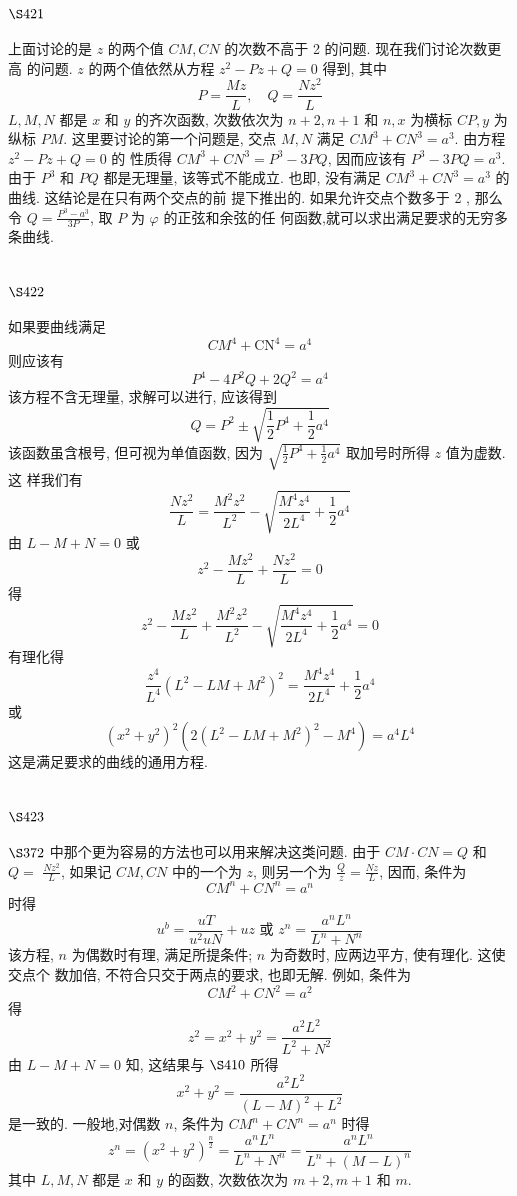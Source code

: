 \section{$\S 421$}

上面讨论的是 $z$ 的两个值 $C M, C N$ 的次数不高于 2 的问题. 现在我们讨论次数更高 的问题. $z$ 的两个值依然从方程 $z^{2}-P z+Q=0$ 得到, 其中
\[
P=\frac{M z}{L}, \quad Q=\frac{N z^{2}}{L}
\]
$L, M, N$ 都是 $x$ 和 $y$ 的齐次函数, 次数依次为 $n+2, n+1$ 和 $n, x$ 为横标 $C P, y$ 为纵标 $P M$. 这里要讨论的第一个问题是, 交点 $M, N$ 满足 $C M^{3}+C N^{3}=a^{3}$. 由方程 $z^{2}-P z+Q=0$ 的 性质得 $C M^{3}+C N^{3}=P^{3}-3 P Q$, 因而应该有 $P^{3}-3 P Q=a^{3}$. 由于 $P^{3}$ 和 $P Q$ 都是无理量, 该等式不能成立. 也即, 没有满足 $C M^{3}+C N^{3}=a^{3}$ 的曲线. 这结论是在只有两个交点的前 提下推出的. 如果允许交点个数多于 2 , 那么令 $Q=\frac{P^{3}-a^{3}}{3 P}$, 取 $P$ 为 $\varphi$ 的正弦和余弦的任 何函数,就可以求出满足要求的无穷多条曲线.

\section{$\S 422$}

如果要曲线满足
\[
C M^{4}+\mathrm{CN}^{4}=a^{4}
\]
则应该有
\[
P^{4}-4 P^{2} Q+2 Q^{2}=a^{4}
\]
该方程不含无理量, 求解可以进行, 应该得到
\[
Q=P^{2} \pm \sqrt{\frac{1}{2} P^{4}+\frac{1}{2} a^{4}}
\]
该函数虽含根号, 但可视为单值函数, 因为 $\sqrt{\frac{1}{2} P^{4}+\frac{1}{2} a^{4}}$ 取加号时所得 $z$ 值为虚数. 这 样我们有
\[
\frac{N z^{2}}{L}=\frac{M^{2} z^{2}}{L^{2}}-\sqrt{\frac{M^{4} z^{4}}{2 L^{4}}+\frac{1}{2} a^{4}}
\]
由 $L-M+N=0$ 或
\[
z^{2}-\frac{M z^{2}}{L}+\frac{N z^{2}}{L}=0
\]
得
\[
z^{2}-\frac{M z^{2}}{L}+\frac{M^{2} z^{2}}{L^{2}}-\sqrt{\frac{M^{4} z^{4}}{2 L^{4}}+\frac{1}{2} a^{4}}=0
\]
有理化得
\[
\frac{z^{4}}{L^{4}}\left(L^{2}-L M+M^{2}\right)^{2}=\frac{M^{4} z^{4}}{2 L^{4}}+\frac{1}{2} a^{4}
\]
或
\[
\left(x^{2}+y^{2}\right)^{2}\left(2\left(L^{2}-L M+M^{2}\right)^{2}-M^{4}\right)=a^{4} L^{4}
\]
这是满足要求的曲线的通用方程.

\section{$\S 423$}

$\S 372$ 中那个更为容易的方法也可以用来解决这类问题. 由于 $C M \cdot C N=Q$ 和 $Q=$ $\frac{N z^{2}}{L}$, 如果记 $C M, C N$ 中的一个为 $z$, 则另一个为 $\frac{Q}{z}=\frac{N z}{L}$, 因而, 条件为
\[
C M^{n}+C N^{n}=a^{n}
\]
时得
\[
u^{b}=\frac{u T}{u^{2} u N}+u z \text { 或 } z^{n}=\frac{a^{n} L^{n}}{L^{n}+N^{n}}
\]
该方程, $n$ 为偶数时有理, 满足所提条件; $n$ 为奇数时, 应两边平方, 使有理化. 这使交点个 数加倍, 不符合只交于两点的要求, 也即无解. 例如, 条件为
\[
C M^{2}+C N^{2}=a^{2}
\]
得
\[
z^{2}=x^{2}+y^{2}=\frac{a^{2} L^{2}}{L^{2}+N^{2}}
\]
由 $L-M+N=0$ 知, 这结果与 $\S 410$ 所得
\[
x^{2}+y^{2}=\frac{a^{2} L^{2}}{(L-M)^{2}+L^{2}}
\]
是一致的. 一般地,对偶数 $n$, 条件为 $C M^{n}+C N^{n}=a^{n}$ 时得
\[
z^{n}=\left(x^{2}+y^{2}\right)^{\frac{n}{2}}=\frac{a^{n} L^{n}}{L^{n}+N^{n}}=\frac{a^{n} L^{n}}{L^{n}+(M-L)^{n}}
\]
其中 $L, M, N$ 都是 $x$ 和 $y$ 的函数, 次数依次为 $m+2, m+1$ 和 $m$.

